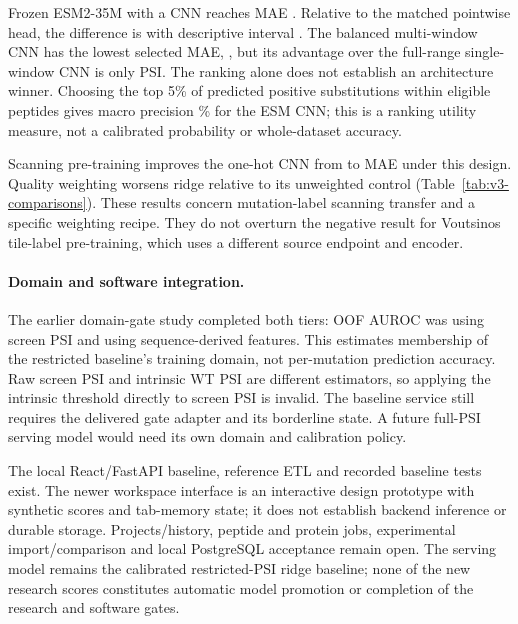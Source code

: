 Frozen ESM2-35M with a CNN reaches MAE \nVthreeCnnD{}. Relative to the matched pointwise head,
the difference is \nVthreeCnnDelta{} with descriptive interval \nVthreeCnnCI{}.
The balanced multi-window CNN has the lowest selected MAE, \nVthreeMcnnE{}, but its advantage
over the full-range single-window CNN is only \nVthreeMcnnGap{} PSI. The ranking alone does not
establish an architecture winner. Choosing the top 5\% of predicted positive substitutions within
eligible peptides gives macro precision \nVthreeCnnTopFive\% for the ESM CNN; this is a ranking
utility measure, not a calibrated probability or whole-dataset accuracy.

\begin{table}[htbp]
  \centering
  \caption{Paired full-PSI MAE differences; negative values favour the first method. The two ridge
  range comparisons use 97.5\% intervals adjusted for two tests; the remaining intervals are
  descriptive 95\% intervals. All use 5,000 protein-group bootstrap resamples.}
  \label{tab:v3-comparisons}
  
\end{table}

Scanning pre-training improves the one-hot CNN from \nVthreeCnnScratch{} to
\nVthreeCnnTransfer{} MAE under this design. Quality weighting worsens ridge relative to its
unweighted control (Table~\ref{tab:v3-comparisons}). These results concern mutation-label scanning
transfer and a specific weighting recipe. They do not overturn the negative result for
Voutsinos tile-label pre-training, which uses a different source endpoint and encoder.



\paragraph{Domain and software integration.}
The earlier domain-gate study completed both tiers: OOF AUROC was \nRthreeLookupAuc{} using
screen PSI and \nRthreeSequenceAuc{} using sequence-derived features. This estimates membership
of the restricted baseline's training domain, not per-mutation prediction accuracy. Raw screen PSI
and intrinsic WT PSI are different estimators, so applying the intrinsic threshold directly to
screen PSI is invalid. The baseline service still requires the delivered gate adapter and its
borderline state. A future full-PSI serving model would need its own domain and calibration policy.

The local React/FastAPI baseline, reference ETL and recorded baseline tests exist. The newer
workspace interface is an interactive design prototype with synthetic scores and tab-memory
state; it does not establish backend inference or durable storage. Projects/history, peptide and
protein jobs, experimental import/comparison and local PostgreSQL acceptance remain open.
The serving model remains the calibrated restricted-PSI ridge baseline; none of the new research
scores constitutes automatic model promotion or completion of the research and software gates.
